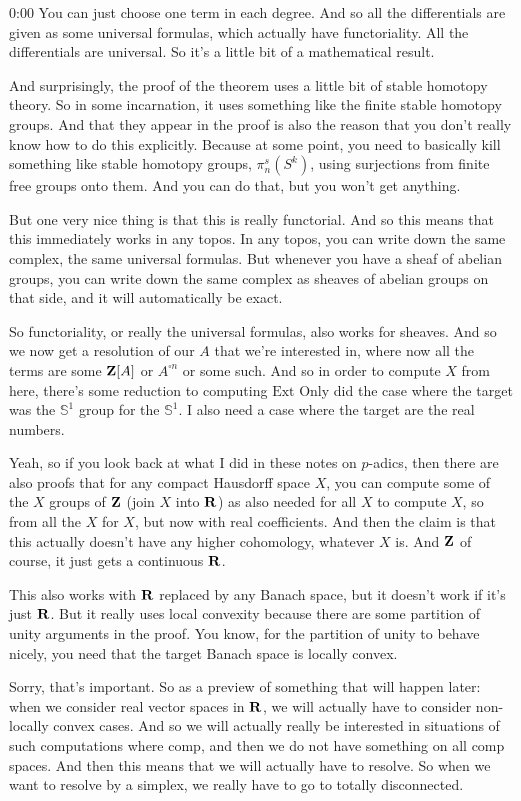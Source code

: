 \begin{unfinished}{0:00}
You can just choose one term in each degree. And so all the differentials are given as some universal formulas, which actually have functoriality. All the differentials are universal. So it's a little bit of a mathematical result.

And surprisingly, the proof of the theorem uses a little bit of stable homotopy theory. So in some incarnation, it uses something like the finite stable homotopy groups. And that they appear in the proof is also the reason that you don't really know how to do this explicitly. Because at some point, you need to basically kill something like stable homotopy groups, $\pi_n^s(S^k)$, using surjections from finite free groups onto them. And you can do that, but you won't get anything.

But one very nice thing is that this is really functorial. And so this means that this immediately works in any topos. In any topos, you can write down the same complex, the same universal formulas. But whenever you have a sheaf of abelian groups, you can write down the same complex as sheaves of abelian groups on that side, and it will automatically be exact.

So functoriality, or really the universal formulas, also works for sheaves. And so we now get a resolution of our $A$ that we're interested in, where now all the terms are some $\mathbf Z[A]$ or $A^{\square n}$ or some such. And so in order to compute $X$ from here, there's some reduction to computing $\text{Ext}$
Only did the case where the target was the $\mathbb{S}^1$ group for the $\mathbb{S}^1$. I also need a case where the target are the real numbers.

Yeah, so if you look back at what I did in these notes on $p$-adics, then there are also proofs that for any compact Hausdorff space $X$, you can compute some of the $X$ groups of $\mathbf Z$ (join $X$ into $\mathbf R$) as also needed for all $X$ to compute $X$, so from all the $X$ for $X$, but now with real coefficients. And then the claim is that this actually doesn't have any higher cohomology, whatever $X$ is. And $\mathbf Z$ of course, it just gets a continuous $\mathbf R$.

This also works with $\mathbf R$ replaced by any Banach space, but it doesn't work if it's just $\mathbf R$. But it really uses local convexity because there are some partition of unity arguments in the proof. You know, for the partition of unity to behave nicely, you need that the target Banach space is locally convex.

Sorry, that's important. So as a preview of something that will happen later: when we consider real vector spaces in $\mathbf R$, we will actually have to consider non-locally convex cases. And so we will actually really be interested in situations of such computations where comp, and then we do not have something on all comp spaces. And then this means that we will actually have to resolve. So when we want to resolve by a simplex, we really have to go to totally disconnected.


\end{unfinished}
